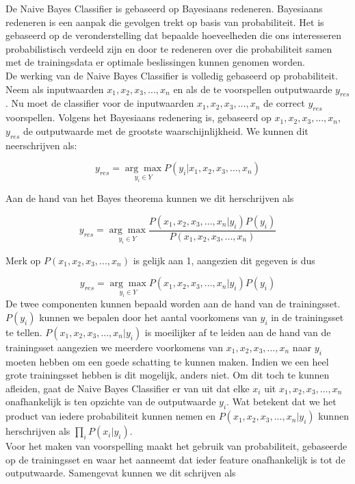 De Naive Bayes Classifier is gebaseerd op Bayesiaans redeneren. Bayesiaans redeneren is een aanpak die gevolgen trekt op basis van probabiliteit. Het is gebaseerd op de veronderstelling dat bepaalde hoeveelheden die ons interesseren probabilistisch verdeeld zijn en door te redeneren over die probabiliteit samen met de trainingsdata er optimale beslissingen kunnen genomen worden.\\%

%
De werking van de Naive Bayes Classifier is volledig gebaseerd op probabiliteit. Neem als inputwaarden $x_{1} , x_{2}, x_{3}, ..., x_{n}$ en als de te voorspellen outputwaarde $y_{res}$. Nu moet de classifier voor de inputwaarden $x_{1} , x_{2}, x_{3}, ..., x_{n}$ de correct $y_{res}$ voorspellen. Volgens het Bayesiaans redenering is, gebaseerd op $x_{1} , x_{2}, x_{3}, ..., x_{n}$,  $y_{res}$ de outputwaarde met de grootste waarschijnlijkheid. We kunnen dit neerschrijven als:

\[y_{res} = \underset{y_i \in Y}{\arg\max}P(y_i|x_{1},x_{2},x_{3},...,x_{n}) \] 

Aan de hand van het Bayes theorema kunnen we dit herschrijven als

\[ y_{res} = \underset{y_i \in Y}{\arg\max}\frac{P(x_{1},x_{2},x_{3},...,x_{n}|y_i)P(y_i)}{P(x_{1},x_{2}, x_{3},...,x_{n})} \]

 Merk op $P(x_{1},x_{2},x_{3},...,x_{n})$ is gelijk aan 1, aangezien dit gegeven is dus

 \[ y_{res} = \underset{y_i \in Y}{\arg\max}P(x_{1},x_{2},x_{3},...,x_{n}|y_i)P(y_i) \]
%
 De twee componenten kunnen bepaald worden aan de hand van de trainingsset. $P(y_i)$ kunnen we bepalen door het aantal voorkomens van $y_i$ in de trainingsset te tellen. $P(x_{1},x_{2},x_{3},...,x_{n}|y_i)$ is moeilijker af te leiden aan de hand van de trainingsset aangezien we meerdere voorkomens van $x_{1},x_{2},x_{3},...,x_{n}$ naar $y_i$ moeten hebben om een goede schatting te kunnen maken.  Indien we een heel grote trainingsset hebben is dit mogelijk, anders niet. Om dit toch te kunnen afleiden, gaat de Naive Bayes Classifier er van uit dat elke $x_i$ uit $x_{1},x_{2},x_{3},...,x_{n}$ onafhankelijk is ten opzichte van de outputwaarde $y_i$. Wat betekent dat we het product van iedere probabiliteit kunnen nemen en $P(x_{1},x_{2},x_{3},...,x_{n}|y_i)$  kunnen herschrijven als $\prod\limits_{i} P(x_{i}|y_{i})$.\\
%
Voor het maken van voorspelling maakt het gebruik van probabiliteit, gebaseerde op de trainingsset en waar het aanneemt dat ieder feature onafhankelijk is tot de outputwaarde. Samengevat kunnen we dit schrijven als


